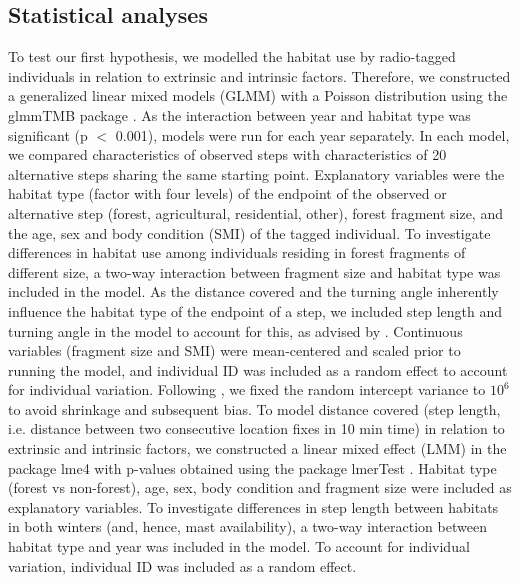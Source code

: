 \documentclass[10pt, twoside]{book} %
\begin{document}
	\subsection*{Statistical analyses}
	
To test our first hypothesis, we modelled the habitat use by radio-tagged individuals in relation to extrinsic and intrinsic factors. Therefore, we constructed a generalized linear mixed models (GLMM) with a Poisson distribution using the glmmTMB package \citep{Brooks2017}. As the interaction between year and habitat type was significant (p $<$ 0.001), models were run for each year separately. In each model, we compared characteristics of observed steps with characteristics of 20 alternative steps sharing the same starting point. Explanatory variables were the habitat type (factor with four levels) of the endpoint of the observed or alternative step (forest, agricultural, residential, other), forest fragment size, and the age, sex and body condition (SMI) of the tagged individual. To investigate differences in habitat use among individuals residing in forest fragments of different size, a two-way interaction between fragment size and habitat type was included in the model. As the distance covered and the turning angle inherently influence the habitat type of the endpoint of a step, we included step length and turning angle in the model to account for this, as advised by \citet{Forester2009}. Continuous variables (fragment size and SMI) were mean-centered and scaled prior to running the model, and individual ID was included as a random effect to account for individual variation. Following \citet{Muff2020}, we fixed the random intercept variance to $10^6$ to avoid shrinkage and subsequent bias. To model distance covered (step length, i.e. distance between two consecutive location fixes in 10 min time) in relation to extrinsic and intrinsic factors, we constructed a linear mixed effect (LMM) in the package lme4 \citep{Bates2015} with p-values obtained using the package lmerTest \citep{Kuznetsova2017}. Habitat type (forest vs non-forest), age, sex, body condition and fragment size were included as explanatory variables. To investigate differences in step length between habitats in both winters (and, hence, mast availability), a two-way interaction between habitat type and year was included in the model. To account for individual variation, individual ID was included as a random effect.\\
\end{document}
